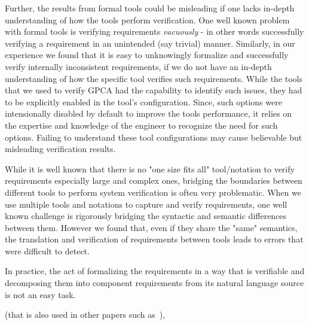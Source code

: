 Further, the results from formal tools could be misleading if one lacks in-depth understanding of how the tools perform verification. One well known problem with formal tools is verifying requirements \emph{vacuously} - in other words successfully verifying a requirement in an unintended (say trivial) manner. Similarly, in our experience we found that it is easy to unknowingly formalize and successfully verify internally inconsistent requirements, if we do not have an in-depth understanding of how the specific tool verifies such requirements. While the tools that we used to verify GPCA had the capability to identify such issues, they had to be explicitly enabled in the tool's configuration. Since, such options were intensionally disabled by default to improve the tools performance, it relies on the expertise and knowledge of the engineer to recognize the need for such options. Failing to understand these tool configurations may cause believable but misleading verification results.

While it is well known that there is no "one size fits all" tool/notation to verify requirements especially large and complex ones, bridging the boundaries between different tools to perform system verification is often very problematic. When we use multiple tools and notations to capture and verify requirements, one well known challenge is rigorously bridging the syntactic and semantic differences between them. However we found that, even if they share the "same" semantics, the translation and verification of requirements between tools leads to errors that were difficult to detect.

In practice, the act of formalizing the requirements in a way that is verifiable and decomposing them into component requirements from its natural language source is not an easy task.

(that is also used in other papers such as~\cite{jeffords2010model,kauppinen2007re, lempia2009requirements}),

\fi
